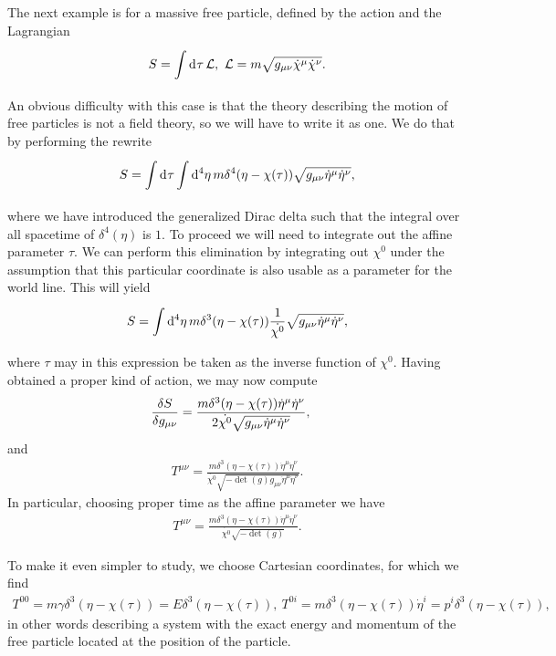 The next example is for a massive free particle, defined by the action and the Lagrangian
\begin{align*}
	S = \int\limits_{}^{}\dd[]{\tau}\mathcal{L},\ \mathcal{L} = m\sqrt{g_{\mu\nu}\dot{\chi}^{\mu}\dot{\chi}^{\nu}}.
\end{align*}
An obvious difficulty with this case is that the theory describing the motion of free particles is not a field theory, so we will have to write it as one. We do that by performing the rewrite
\begin{align*}
	S = \int\limits_{}^{}\dd[]{\tau}\int\limits_{}^{}\dd[4]{\eta}m\delta^{4}(\eta - \chi(\tau))\sqrt{g_{\mu\nu}\dot{\eta}^{\mu}\dot{\eta}^{\nu}},
\end{align*}
where we have introduced the generalized Dirac delta such that the integral over all spacetime of $\delta^{4}(\eta)$ is $1$. To proceed we will need to integrate out the affine parameter $\tau$. We can perform this elimination by integrating out $\chi^{0}$ under the assumption that this particular coordinate is also usable as a parameter for the world line. This will yield
\begin{align*}
	S = \int\limits_{}^{}\dd[4]{\eta}m\delta^{3}(\eta - \chi(\tau))\frac{1}{\dot{\chi^{0}}}\sqrt{g_{\mu\nu}\dot{\eta}^{\mu}\dot{\eta}^{\nu}},
\end{align*}
where $\tau$ may in this expression be taken as the inverse function of $\chi^{0}$. Having obtained a proper kind of action, we may now compute
\begin{align*}
	\fdv{S}{g_{\mu\nu}} &= \frac{m\delta^{3}(\eta - \chi(\tau))\dot{\eta}^{\mu}\dot{\eta}^{\nu}}{2\dot{\chi^{0}}\sqrt{g_{\mu\nu}\dot{\eta}^{\mu}\dot{\eta}^{\nu}}},
\end{align*}
and
\begin{align*}
	T^{\mu\nu} = \frac{m\delta^{3}(\eta - \chi(\tau))\dot{\eta}^{\mu}\dot{\eta}^{\nu}}{\dot{\chi^{0}}\sqrt{-\det(g)g_{\mu\nu}\dot{\eta}^{\mu}\dot{\eta}^{\nu}}}.
\end{align*}
In particular, choosing proper time as the affine parameter we have
\begin{align*}
	T^{\mu\nu} = \frac{m\delta^{3}(\eta - \chi(\tau))\dot{\eta}^{\mu}\dot{\eta}^{\nu}}{\dot{\chi^{0}}\sqrt{-\det(g)}}.
\end{align*}

To make it even simpler to study, we choose Cartesian coordinates, for which we find
\begin{align*}
	T^{00} = m\gamma\delta^{3}(\eta - \chi(\tau)) = E\delta^{3}(\eta - \chi(\tau)),\ T^{0i} = m\delta^{3}(\eta - \chi(\tau))\dot{\eta}^{i} = p^{i}\delta^{3}(\eta - \chi(\tau)),
\end{align*}
in other words describing a system with the exact energy and momentum of the free particle located at the position of the particle.

